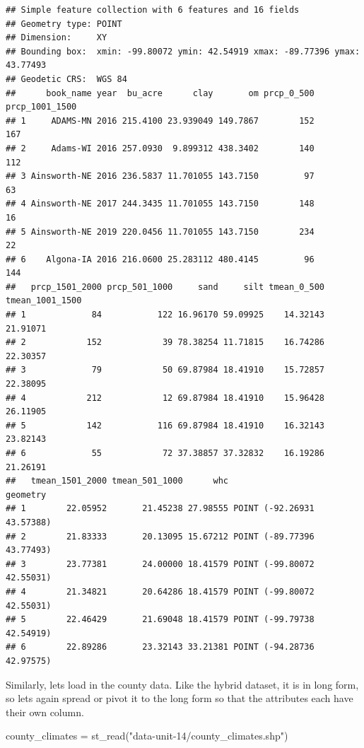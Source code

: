 \documentclass[
]{book}
\newenvironment{Shaded}{\begin{snugshade}}{\end{snugshade}}
\newcommand{\FunctionTok}[1]{\textcolor[rgb]{0.00,0.00,0.00}{#1}}
\newcommand{\NormalTok}[1]{#1}
\newcommand{\OtherTok}[1]{\textcolor[rgb]{0.56,0.35,0.01}{#1}}
\newcommand{\StringTok}[1]{\textcolor[rgb]{0.31,0.60,0.02}{#1}}
\begin{document}
\begin{verbatim}
## Simple feature collection with 6 features and 16 fields
## Geometry type: POINT
## Dimension:     XY
## Bounding box:  xmin: -99.80072 ymin: 42.54919 xmax: -89.77396 ymax: 43.77493
## Geodetic CRS:  WGS 84
##      book_name year  bu_acre      clay       om prcp_0_500 prcp_1001_1500
## 1     ADAMS-MN 2016 215.4100 23.939049 149.7867        152            167
## 2     Adams-WI 2016 257.0930  9.899312 438.3402        140            112
## 3 Ainsworth-NE 2016 236.5837 11.701055 143.7150         97             63
## 4 Ainsworth-NE 2017 244.3435 11.701055 143.7150        148             16
## 5 Ainsworth-NE 2019 220.0456 11.701055 143.7150        234             22
## 6    Algona-IA 2016 216.0600 25.283112 480.4145         96            144
##   prcp_1501_2000 prcp_501_1000     sand     silt tmean_0_500 tmean_1001_1500
## 1             84           122 16.96170 59.09925    14.32143        21.91071
## 2            152            39 78.38254 11.71815    16.74286        22.30357
## 3             79            50 69.87984 18.41910    15.72857        22.38095
## 4            212            12 69.87984 18.41910    15.96428        26.11905
## 5            142           116 69.87984 18.41910    16.32143        23.82143
## 6             55            72 37.38857 37.32832    16.19286        21.26191
##   tmean_1501_2000 tmean_501_1000      whc                   geometry
## 1        22.05952       21.45238 27.98555 POINT (-92.26931 43.57388)
## 2        21.83333       20.13095 15.67212 POINT (-89.77396 43.77493)
## 3        23.77381       24.00000 18.41579 POINT (-99.80072 42.55031)
## 4        21.34821       20.64286 18.41579 POINT (-99.80072 42.55031)
## 5        22.46429       21.69048 18.41579 POINT (-99.79738 42.54919)
## 6        22.89286       23.32143 33.21381 POINT (-94.28736 42.97575)
\end{verbatim}

Similarly, lets load in the county data. Like the hybrid dataset, it is in long form, so lets again spread or pivot it to the long form so that the attributes each have their own column.

\begin{Shaded}
\begin{Highlighting}[]
\NormalTok{county\_climates }\OtherTok{=} \FunctionTok{st\_read}\NormalTok{(}\StringTok{"data{-}unit{-}14/county\_climates.shp"}\NormalTok{)}
\end{Highlighting}
\end{Shaded}
\end{document}
